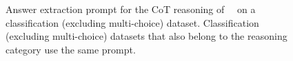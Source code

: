 \begin{figure}[h!]
\centering
\begin{minipage}{0.98\textwidth}
\setlength{\fboxsep}{1em} %
\setlength{\fboxrule}{1pt} %
\caption{Answer extraction prompt for the CoT reasoning of \zeroshotmid\ \method\ on a classification (excluding multi-choice) dataset. Classification (excluding multi-choice) datasets that also belong to the reasoning category use the same prompt.}
\label{table:reasoning-prompts-classification}
\end{minipage}
\end{figure}